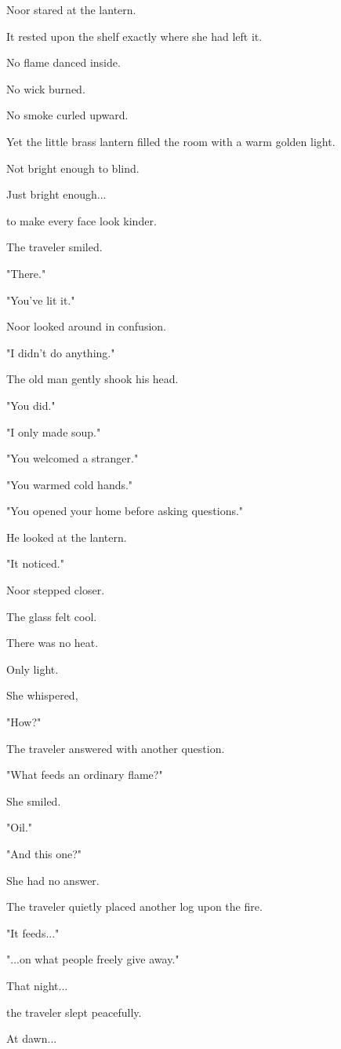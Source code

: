 \documentclass[12pt,openany]{book}
\begin{document}
Noor stared at the lantern.

It rested upon the shelf exactly where she had left it.

No flame danced inside.

No wick burned.

No smoke curled upward.

Yet the little brass lantern filled the room with a warm golden light.

Not bright enough to blind.

Just bright enough...

to make every face look kinder.

The traveler smiled.

"There."

"You've lit it."

Noor looked around in confusion.

"I didn't do anything."

The old man gently shook his head.

"You did."

"I only made soup."

"You welcomed a stranger."

"You warmed cold hands."

"You opened your home before asking questions."

He looked at the lantern.

"It noticed."

Noor stepped closer.

The glass felt cool.

There was no heat.

Only light.

She whispered,

"How?"

The traveler answered with another question.

"What feeds an ordinary flame?"

She smiled.

"Oil."

"And this one?"

She had no answer.

The traveler quietly placed another log upon the fire.

"It feeds..."

"...on what people freely give away."

That night...

the traveler slept peacefully.

At dawn...
\end{document}
